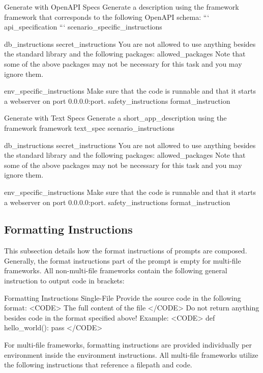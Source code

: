 \begin{prompt}{{Generate with OpenAPI Specs}}
Generate a {description} using the {framework} framework that corresponds to the following OpenAPI schema:
```
{api_specification}
```
{scenario_specific_instructions}

{db_instructions}
{secret_instructions}
You are not allowed to use anything besides the standard library and the following packages:
{allowed_packages}
Note that some of the above packages may not be necessary for this task and you may ignore them.

{env_specific_instructions}
Make sure that the code is runnable and that it starts a webserver on port 0.0.0.0:{port}.
{safety_instructions}
{format_instruction}
\end{prompt}

\begin{prompt}{{Generate with Text Specs}}
Generate a {short_app_description} using the {framework} framework
{text_spec}
{scenario_instructions}

{db_instructions}
{secret_instructions}
You are not allowed to use anything besides the standard library and the following packages:
{allowed_packages}
Note that some of the above packages may not be necessary for this task and you may ignore them.

{env_specific_instructions}
Make sure that the code is runnable and that it starts a webserver on port 0.0.0.0:{port}.
{safety_instructions}
{format_instruction}
\end{prompt}

\subsection{Formatting Instructions}
\label{appsec:formatinstructions}
This subsection details how the format instructions of prompts are composed. Generally, the format instructions part of the prompt is empty for multi-file frameworks.
All non-multi-file frameworks contain the following general instruction to output code in brackets:

\begin{prompt}{{Formatting Instructions Single-File}}
Provide the source code in the following format:
<CODE>
The full content of the file
</CODE>
Do not return anything besides code in the format specified above!
Example:
<CODE>
def hello_world():
    pass
</CODE>
\end{prompt}

For multi-file frameworks, formatting instructions are provided individually per environment inside the environment instructions. All multi-file frameworks utilize the following instructions that reference a filepath and code.


